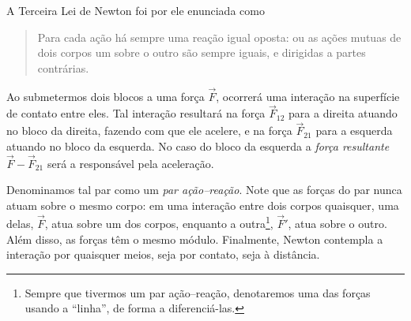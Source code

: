 A Terceira Lei de Newton foi por ele enunciada como
\begin{quote}
    Para cada ação há sempre uma reação igual oposta: ou as ações mutuas de dois corpos um sobre o outro são sempre iguais, e dirigidas a partes contrárias.
\end{quote}

\begin{marginfigure}
\centering
{}
\caption{Ao submetermos dois blocos a uma força $\vec{F}$, ocorrerá uma interação na superfície de contato entre eles. Tal interação resultará na força $\vec{F}_{12}$ para a direita atuando no bloco da direita, fazendo com que ele acelere, e na força $\vec{F}_{21}$ para a esquerda atuando no bloco da esquerda. No caso do bloco da esquerda a \emph{força resultante} $\vec{F} - \vec{F}_{21}$ será a responsável pela aceleração.}
\end{marginfigure}

\noindent{}Denominamos tal par como um \emph{par ação--reação}. Note que as forças do par nunca atuam sobre o mesmo corpo: em uma interação entre dois corpos quaisquer, uma delas, $\vec{F}$, atua sobre um dos corpos, enquanto a outra\footnote{Sempre que tivermos um par ação--reação, denotaremos uma das forças usando a ``linha'', de forma a diferenciá-las.}, $\vec{F}'$, atua sobre o outro. Além disso, as forças têm o mesmo módulo. Finalmente, Newton contempla a interação por quaisquer meios, seja por contato, seja à distância.

